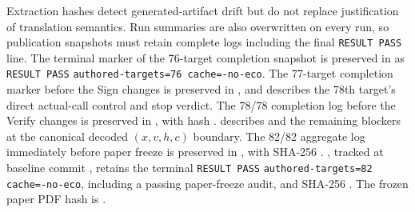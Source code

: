 {\small\raggedright
Extraction hashes detect generated-artifact drift but do not replace justification
of translation semantics. Run summaries are also overwritten on every run, so
publication snapshots must retain complete logs including the final
\texttt{RESULT PASS} line. The terminal marker of the 76-target completion snapshot
is preserved in  as
\texttt{RESULT PASS}\newline
\texttt{authored-targets=76 cache=-no-eco}. The 77-target completion marker before
the Sign changes is preserved in
, and
 describes the 78th target's direct actual-call
control and stop verdict. The 78/78 completion log before the Verify changes is
preserved in , with hash
.
 describes
\allowbreak
{} and the remaining blockers at the canonical decoded
\((x,v,h,c)\) boundary. The 82/82 aggregate log immediately before paper freeze
is preserved in , with SHA-256
.
\newline
{}, tracked at baseline commit
, retains the terminal
\texttt{RESULT PASS}\newline
\texttt{authored-targets=82}\newline
\texttt{cache=-no-eco}, including a passing paper-freeze audit, and SHA-256
.
The frozen paper PDF hash is
.
\par}


